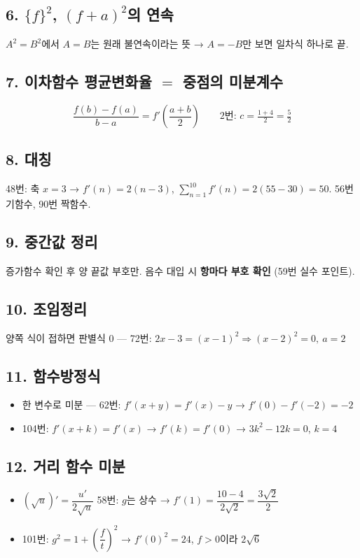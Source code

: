 \documentclass[11pt,a4paper]{article}
\begin{document}
\subsection{6. $\{f\}^2$, $(f+a)^2$의 연속 }
$A^2=B^2$에서 $A=B$는 원래 불연속이라는 뜻 → $A=-B$만 보면 일차식 하나로 끝.

\subsection{7. 이차함수 평균변화율 $=$ 중점의 미분계수 }
\[
\frac{f(b)-f(a)}{b-a}=f'\!\left(\frac{a+b}{2}\right)\qquad\text{2번: } c=\tfrac{1+4}{2}=\tfrac52
\]

\subsection{8. 대칭 }
48번: 축 $x=3$ → $f'(n)=2(n-3)$, \;$\displaystyle\sum_{n=1}^{10}f'(n)=2(55-30)=50$. \;56번 기함수, 90번 짝함수.

\subsection{9. 중간값 정리 }
증가함수 확인 후 양 끝값 부호만. 음수 대입 시 \textbf{항마다 부호 확인} (59번 실수 포인트).

\subsection{10. 조임정리 }
양쪽 식이 접하면 판별식 $0$ — 72번: $2x-3=(x-1)^2 \Rightarrow (x-2)^2=0,\ a=2$

\subsection{11. 함수방정식 }
\begin{itemize}
\item 한 변수로 미분 — 62번: $f'(x+y)=f'(x)-y$ → $f'(0)-f'(-2)=-2$
\item 104번: $f'(x+k)=f'(x)$ → $f'(k)=f'(0)$ → $3k^2-12k=0$, $k=4$
\end{itemize}

\subsection{12. 거리 함수 미분 }
\begin{itemize}
\item $(\sqrt u)'=\dfrac{u'}{2\sqrt u}$ \quad 58번: $g$는 상수 → $f'(1)=\dfrac{10-4}{2\sqrt2}=\dfrac{3\sqrt2}{2}$
\item 101번: $g^2=1+\left(\dfrac{f}{t}\right)^2$ → $f'(0)^2=24$, $f>0$이라 $2\sqrt6$
\end{itemize}
\end{document}
